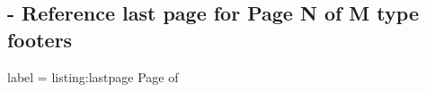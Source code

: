 
\subsection{ - Reference last page for Page N of M type footers}

\begin{tcblisting}{label = listing:lastpage}
  Page \thepage{} of \pageref{LastPage}
\end{tcblisting}
